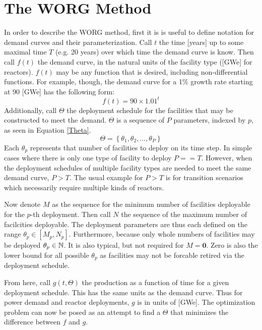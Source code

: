 \section{The WORG Method}
\label{method}

In order to describe the WORG method, first it is is useful to define  
notation for demand curves and their parameterization.  Call $t$ the time
[years] up to some maximal time $T$ (e.g. 20 years) over which time the
demand curve is know.  Then call $f(t)$ the demand curve, in the natural 
units of the facility type ([GWe] for reactors).
$f(t)$ may be any function that is desired, including non-differential 
functions. For example, though, the demand curve for a 1\% growth rate 
starting at 90 [GWe] has the following form:
\begin{equation}
\label{f-1}
f(t) = 90\times 1.01^t
\end{equation}
Additionally, call $\Theta$ the deployment schedule for the facilities that 
may be constructed to meet the demand.
$\Theta$ is a sequence of $P$ parameters, indexed by $p$, as seen in 
Equation \ref{Theta}.
\begin{equation}
\label{Theta}
\Theta = \left\{\theta_1, \theta_2, \ldots, \theta_P\right\}
\end{equation}
Each $\theta_p$ represents that number of facilities to deploy on its
time step. In simple cases where there is only one type of facility
to deploy $P == T$.  However, when the deployment schedules of multiple 
facility types are needed to meet the same demand curve, $P > T$.  The usual
example for $P > T$ is for transition scenarios which necessarily require 
multiple kinds of reactors.

Now denote $M$ as the sequence for the minimum number of facilities deployable
for the $p$-th deployment. Then call $N$ the sequence of the maximum number
of facilcities deployable. The deployment parameters are thus each defined
on the range $\theta_p \in [M_p, N_p]$. Furthermore, because only whole
numbers of facilities may be deployed $\theta_p \in \mathbb{N}$.  It is also typical, 
but not required for $M = \mathbf{0}$. Zero is also the lower bound
for all possible $\theta_p$ as facilities may not be forcable retired via the
deployment schedule.

From here, call $g(t, \Theta)$ the production as a function of time for a
given deployment schedule. This has the same units as the demand curve.
Thus for power demand and reactor deployments, $g$ is in units of [GWe]. The 
optimization problem can now be posed as an attempt to find a $\Theta$
that minimizes the difference between $f$ and $g$.




